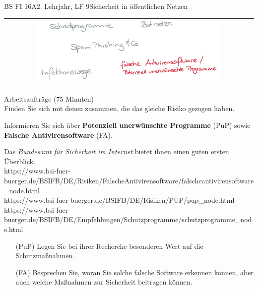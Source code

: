 \documentclass[oneside,openany,headings=optiontotoc,11pt,numbers=noenddot]{scrreprt}
\begin{document}
	\begin{worksheet}{BS FI 16A}{2. Lehrjahr, LF 9}{Sicherheit in öffentlichen Netzen}
		
		\begin{framed}
			\begin{tabular}{lcr}
				& \includegraphics[width=0.8\textwidth]{Bilder/AntivirUnwantedProg.jpg} & \\
			\end{tabular}
		\end{framed}
		\color{codegray}Arbeitsaufträge (75 Minuten)\\
		\color{black}
		Finden Sie sich mit denen zusammen, die das gleiche Risiko gezogen haben.
		\par
		\bigskip
		\noindent
		Informieren Sie sich über \textbf{Potenziell unerwünschte Programme} (PuP) sowie \textbf{Falsche Antivirensoftware} (FA).
		\par
		\bigskip
		\noindent
		Das \textit{Bundesamt für Sicherheit im Internet} bietet ihnen einen guten ersten Überblick.\\
		\small{\color{codegray}https://www.bsi-fuer-buerger.de/BSIFB/DE/Risiken/FalscheAntivirensoftware/falscheantivirensoftware\_node.html\\
		https://www.bsi-fuer-buerger.de/BSIFB/DE/Risiken/PUP/pup\_node.html\\
		https://www.bsi-fuer-buerger.de/BSIFB/DE/Empfehlungen/Schutzprogramme/schutzprogramme\_node.html}
		\normalsize
		\begin{itemize}
			\item[(PuP)] Legen Sie bei ihrer Recherche besonderen Wert auf die Schutzmaßnahmen.
			\item[(FA)] Besprechen Sie, woran Sie solche falsche Software erkennen können, aber auch welche Maßnahmen zur Sicherheit beitragen können.
		\end{itemize}
	

\end{worksheet}
\end{document}
